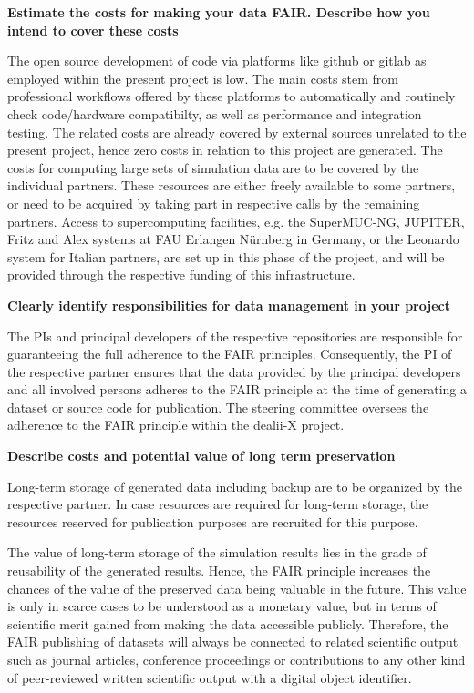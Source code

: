 \documentclass[a4paper,12pt]{article}
\begin{document}
\noindent \textbf{Estimate the costs for making your data FAIR. Describe how you intend to cover these costs}

The open source development of code via platforms like github or gitlab as employed within the present project is low. The main costs stem from professional workflows offered by these platforms to automatically and routinely check code/hardware compatibilty, as well as performance and integration testing. The related costs are already covered by external sources unrelated to the present project, hence zero costs in relation to this project are generated. The costs for computing large sets of simulation data are to be covered by the individual partners. These resources are either freely available to some partners, or need to be acquired by taking part in respective calls by the remaining partners. Access to supercomputing facilities, e.g. the SuperMUC-NG, JUPITER, Fritz and Alex systems at FAU Erlangen Nürnberg in Germany, or the Leonardo system for Italian partners, are set up in this phase of the project, and will be provided through the respective funding of this infrastructure.

\noindent \textbf{Clearly identify responsibilities for data management in your project}

The PIs and principal developers of the respective repositories are responsible for guaranteeing the full adherence to the FAIR principles. Consequently, the PI of the respective partner ensures that the data provided by the principal developers and all involved persons adheres to the FAIR principle at the time of generating a dataset or source code for publication. The steering committee oversees the adherence to the FAIR principle within the dealii-X project.

\noindent \textbf{Describe costs and potential value of long term preservation}

Long-term storage of generated data including backup are to be organized by the respective partner. In case resources are required for long-term storage, the resources reserved for publication purposes are recruited for this purpose.

The value of long-term storage of the simulation results lies in the grade of reusability of the generated results. Hence, the FAIR principle increases the chances of the value of the preserved data being valuable in the future. This value is only in scarce cases to be understood as a monetary value, but in terms of scientific merit gained from making the data accessible publicly. Therefore, the FAIR publishing of datasets will always be connected to related scientific output such as journal articles, conference proceedings or contributions to any other kind of peer-reviewed written scientific output with a digital object identifier.  
\end{document}
